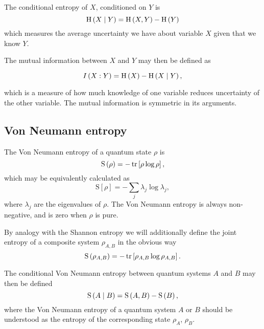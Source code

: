 The conditional entropy of $X$, conditioned on $Y$ is
\begin{equation}
\text{H}\left(X \; \middle| \; Y\right) = \text{H}\left(X, Y\right) - \text{H}\left(Y\right)
\end{equation}
which measures the average uncertainty we have about variable $X$ given that we know $Y$.


The mutual information between $X$ and $Y$ may then be defined as

\begin{equation}
I\left(X : Y\right) = \text{H}\left(X\right) - \text{H}\left(X \; \middle| \; Y\right),
\end{equation}

\noindent which is a measure of how much knowledge of one variable reduces uncertainty of the other variable. The mutual information is symmetric in its arguments.


\FloatBarrier
\subsection{Von Neumann entropy}
The Von Neumann entropy of a quantum state $\rho$ is
\begin{equation}
\text{S}\left(\rho\right) = - \tr\left[\rho \log \rho \right],
\end{equation}
which may be equivalently calculated as
\begin{equation}
\text{S}\left[\rho\right] = - \sum_j \lambda_j \log \lambda_j,
\end{equation}
where $\lambda_j$ are the eigenvalues of $\rho$. The Von Neumann entropy is always non-negative, and is zero when $\rho$ is pure.

By analogy with the Shannon entropy we will additionally define the joint entropy of a composite system $\rho_{A, B}$ in the obvious way
\begin{equation}
\text{S}\left(\rho_{A, B}\right) = - \tr\left[\rho_{A, B} \log \rho_{A, B}\right].
\end{equation}

The conditional Von Neumann entropy between quantum systems $A$ and $B$ may then be defined
\begin{equation}
\text{S}\left(A \; \middle| \; B\right) = \text{S}\left(A, B\right) - \text{S}\left(B\right),
\end{equation}
where the Von Neumann entropy of a quantum system $A$ or $B$ should be understood as the entropy of the corresponding state $\rho_A$, $\rho_B$.


\FloatBarrier
